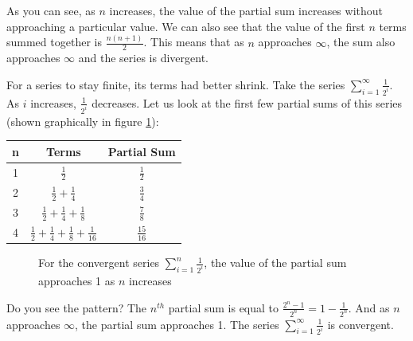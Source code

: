 As you can see, as $n$ increases, the value of the partial sum 
increases without approaching a particular value. We can also see 
that the value of the first $n$ terms summed together is 
$\frac{n(n+1)}{2}$. This means that as $n$ approaches $\infty$, the 
sum also approaches $\infty$ and the series is divergent. 

For a series to stay finite, its terms had better shrink. Take the series $\sum_{i=1}^\infty 
\frac{1}{2^i}$. As $i$ increases, $\frac{1}{2^i}$ decreases. Let us 
look at the first few partial sums of this series (shown graphically 
in figure \ref{fig:convsum}):
\begin{center}
\begin{tabular}{|c|c|c|}\hline
n & Terms & Partial Sum\\
\hline
1 & $\frac{1}{2}$ & $\frac{1}{2}$\\
\hline
2 & $\frac{1}{2} + \frac{1}{4}$ & $\frac{3}{4}$\\
\hline
3 & $\frac{1}{2} + \frac{1}{4} + \frac{1}{8}$ & $\frac{7}{8}$\\
\hline
4 & $\frac{1}{2} + \frac{1}{4} + \frac{1}{8} + \frac{1}{16}$ & 
$\frac{15}{16}$\\
\hline
\end{tabular}
\end{center}

\begin{figure}[H]
\centering
    \caption{For the convergent series $\sum_{i=1}^n \frac{1}{2^i}$, 
    the value of the partial sum approaches 1 as $n$ increases}
    \label{fig:convsum}
\end{figure}

Do you see the pattern? The $n^{th}$ partial sum is equal to 
$\frac{2^n - 1}{2^n} = 1 - \frac{1}{2^n}$. And as $n$ approaches 
$\infty$, the partial sum approaches 1. The series $\sum_{i=1}^\infty 
\frac{1}{2^i}$ is convergent. 

